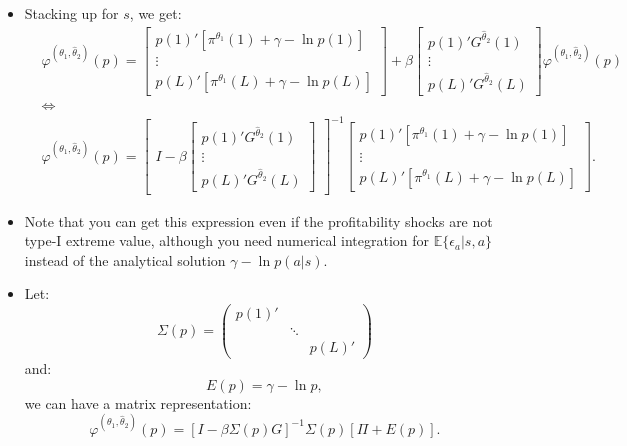 \documentclass[
]{book}
\begin{document}
\begin{itemize}
\item
  Stacking up for \(s\), we get:
  \begin{equation}
  \begin{split}
  &\varphi^{(\theta_1, \hat{\theta}_2)}(p) =
  \begin{bmatrix}
  p(1)'[\pi^{\theta_1}(1) + \gamma - \ln p(1)]\\
  \vdots\\
  p(L)'[\pi^{\theta_1}(L) + \gamma - \ln p(L)]
  \end{bmatrix}
  +\beta
  \begin{bmatrix}
  p(1)' G^{\hat{\theta}_2}(1)\\
  \vdots\\
  p(L)' G^{\hat{\theta}_2}(L)
  \end{bmatrix}
  \varphi^{(\theta_1, \hat{\theta}_2)}(p)\\
  &\Leftrightarrow\\
  &\varphi^{(\theta_1, \hat{\theta}_2)}(p) = 
  \begin{bmatrix}
  I -
  \beta
  \begin{bmatrix}
  p(1)' G^{\hat{\theta}_2}(1)\\
  \vdots\\
  p(L)' G^{\hat{\theta}_2}(L)
  \end{bmatrix}
  \end{bmatrix}^{-1}
  \begin{bmatrix}
  p(1)'[\pi^{\theta_1}(1) + \gamma - \ln p(1)]\\
  \vdots\\
  p(L)'[\pi^{\theta_1}(L) + \gamma - \ln p(L)]
  \end{bmatrix}.
  \end{split}
  \end{equation}
\item
  Note that you can get this expression even if the profitability shocks are not type-I extreme value, although you need numerical integration for \(\mathbb{E}\{\epsilon_a|s, a\}\) instead of the analytical solution \(\gamma - \ln p(a|s)\).
\item
  Let:
  \[
  \Sigma(p) =
  \begin{pmatrix}
  p(1)' & & \\
   & \ddots & \\
   & & p(L)'
  \end{pmatrix}
  \]
  and:
  \[
  E(p) = 
  \gamma - \ln p,
  \]
  we can have a matrix representation:
  \[
  \varphi^{(\theta_1, \hat{\theta}_2)}(p) = [I - \beta \Sigma(p) G]^{-1}\Sigma(p)[\Pi + E(p)].
  \]
\end{itemize}
\end{document}
